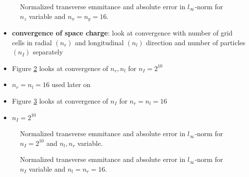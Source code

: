 \begin{center}
\begin{figure}[H]
   \begin{subfigure}{0.4\textwidth}
      
   \end{subfigure}
   \qquad \qquad \qquad
   \begin{subfigure}{0.4\textwidth}
      
   \end{subfigure}
   \caption{Normalized transverse emmitance and absolute error in $l_\infty$-norm for $n_z$ variable and $n_x=n_y=16$.}
   \label{fig:map_cvg_z}
\end{figure}
\end{center}

\begin{itemize}
   \item \textbf{convergence of space charge}: look at convergence with number of grid cells in radial $(n_r)$ and longitudinal $(n_l)$ direction and number of particles $(n_I)$ separately

   \item Figure \ref{fig:sc_cvg_rl} looks at convergence of $n_r, n_l$ for $n_I=2^{10}$
   \item $n_r=n_l=16$ used later on

   \item Figure \ref{fig:sc_cvg_I} looks at convergence of $n_I$ for $n_r=n_l=16$
   \item $n_I=2^{10}$
\end{itemize}

\begin{center}
\begin{figure}[H]
   \begin{subfigure}{0.4\textwidth}
      
   \end{subfigure}
   \qquad \qquad \qquad
   \begin{subfigure}{0.4\textwidth}
      
   \end{subfigure}
   \caption{Normalized transverse emmitance and absolute error in $l_\infty$-norm for $n_I=2^{10}$ and $n_l, n_r$ variable.}
   \label{fig:sc_cvg_rl}
\end{figure}
\end{center}

\begin{center}
\begin{figure}[H]
   \begin{subfigure}{0.4\textwidth}
      
   \end{subfigure}
   \qquad \qquad \qquad
   \begin{subfigure}{0.4\textwidth}
      
   \end{subfigure}
   \caption{Normalized transverse emmitance and absolute error in $l_\infty$-norm for $n_I$ variable and $n_l=n_r=16$.}
   \label{fig:sc_cvg_I}
\end{figure}
\end{center}

